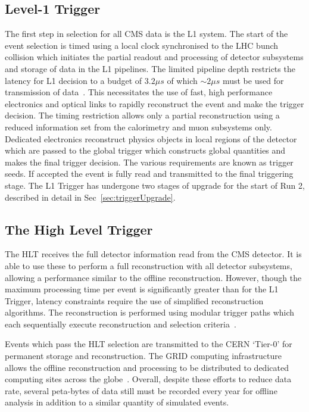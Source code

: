 \subsection{Level-1 Trigger}

The first step in selection for all CMS data is the L1 system. The start of the event selection is timed using a local clock
synchronised to the LHC bunch collision which initiates the partial readout and processing of detector subsystems and storage 
of data in the L1 pipelines. The limited pipeline depth restricts the latency for L1 decision to a budget of $3.2\mu s$
of which $\sim2\mu s$ must be used for transmission of data~\cite{daq_performance}. This necessitates the use of fast, high performance electronics
and optical links to rapidly reconstruct the event and make the trigger decision. The timing restriction allows only 
a partial reconstruction using a reduced information set from the calorimetry and muon subsystems only. Dedicated electronics
reconstruct physics objects in local regions of the detector which are passed to the global trigger which constructs global
quantities and makes the final trigger decision. The various requirements are known as trigger seeds. 
If accepted the event is fully read and transmitted to the final triggering
stage. The L1 Trigger has undergone two stages of upgrade for the start of Run 2, described in detail in Sec~\ref{sec:triggerUpgrade}.

\subsection{The High Level Trigger}

The HLT receives the full detector information read from the CMS detector. It is able to use these to perform 
a full reconstruction with all detector subsystems, allowing a performance similar to the offline reconstruction. However, 
though the maximum processing time per event is significantly greater than for the L1 Trigger, latency constraints 
require the use of simplified reconstruction algorithms. The reconstruction is performed using modular trigger paths
which each sequentially execute reconstruction and selection criteria~\cite{daq_performance}. 

Events which pass the HLT selection are transmitted to the CERN `Tier-0' for permanent storage and reconstruction. 
The GRID computing infrastructure allows the offline reconstruction and processing to be distributed to dedicated 
computing sites across the globe~\cite{grid_tdr}. Overall, despite these efforts to reduce data rate, 
several peta-bytes of data still must be recorded every year for offline analysis in addition to 
a similar quantity of simulated events.

